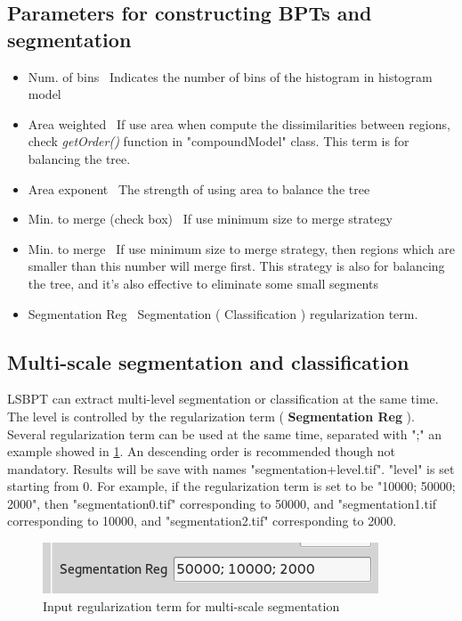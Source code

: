 \documentclass[10pt,a4paper]{article}
\begin{document}
\subsection{ Parameters for constructing BPTs and segmentation}

\begin{itemize}
	\item Num. of bins \ Indicates the number of bins of the histogram in histogram model
	\item Area weighted \ If use area when compute the dissimilarities between regions, check 				\textit{getOrder()} function in "compoundModel" class. This term is for balancing the tree.
	\item Area exponent \ The strength of using area to balance the tree
	\item Min. to merge (check box) \ If use minimum size to merge strategy
	\item Min. to merge \ If use minimum size to merge strategy, then regions which are smaller
	than this number will merge first. This strategy is also for balancing the tree, and it's also effective to eliminate some small segments
	\item Segmentation Reg \ Segmentation ( Classification ) regularization term. 
\end{itemize}



\subsection{ Multi-scale segmentation and classification }

LSBPT can extract multi-level segmentation or classification at the same time. The level is controlled by the regularization term ( \textbf{ Segmentation Reg} ). Several regularization term can be used at the same time, separated with ";" an example showed in \ref{fig:multi-scale}. An descending order is recommended though not mandatory. Results will be save with names
"segmentation+level.tif". "level" is set starting from 0. For example, if the regularization term is set to be "10000; 50000; 2000", then "segmentation0.tif" corresponding to 50000, and "segmentation1.tif corresponding to 10000, and "segmentation2.tif" corresponding to 2000.

\begin{figure}
\centering
	\includegraphics[scale=1]{figs/multi-scale.png}
\caption{ Input regularization term for multi-scale segmentation }
 \label{fig:multi-scale}
\end{figure}
\end{document}
